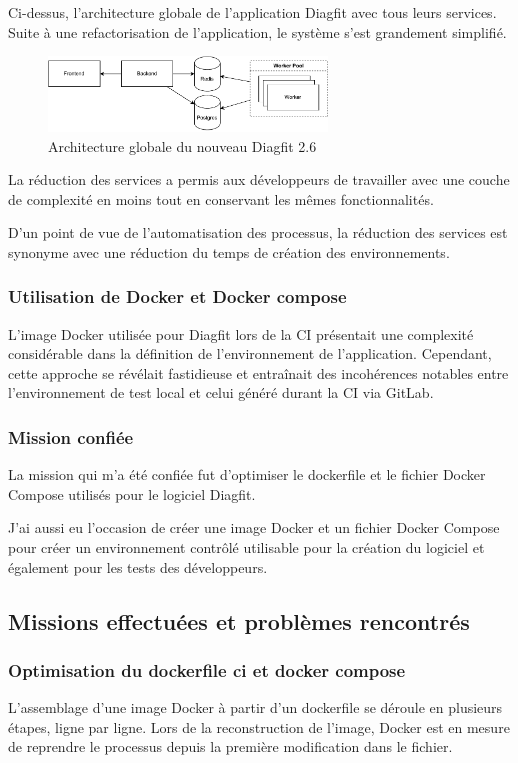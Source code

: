 Ci-dessus, l'architecture globale de l'application Diagfit avec tous leurs services.
Suite à une refactorisation de l'application, le système s'est grandement simplifié.

\begin{figure}[ht!]
    \centering
    \includegraphics[width=0.66\textwidth]{paper/figures/archi2-6.pdf}
    \caption{Architecture globale du nouveau Diagfit 2.6}
    \label{fig:archi2-6}
\end{figure}

La réduction des services a permis aux développeurs de travailler avec une couche de complexité en moins tout en conservant les mêmes fonctionnalités.

D'un point de vue de l'automatisation des processus, la réduction des services est synonyme avec une réduction du temps de création des environnements.

\subsubsection{Utilisation de Docker et Docker compose}
L'image Docker utilisée pour Diagfit lors de la CI présentait une complexité considérable dans la définition de l'environnement de l'application.
Cependant, cette approche se révélait fastidieuse et entraînait des incohérences notables entre l'environnement de test local et celui généré durant la CI via GitLab.

\subsubsection{Mission confiée}
La mission qui m'a été confiée fut d'optimiser le dockerfile et le fichier Docker Compose utilisés pour le logiciel Diagfit.

J'ai aussi eu l'occasion de créer une image Docker et un fichier Docker Compose pour créer un environnement contrôlé utilisable pour la création du logiciel et également pour les tests des développeurs.


\subsection{Missions effectuées et problèmes rencontrés}
\subsubsection{Optimisation du dockerfile ci et docker compose}
L'assemblage d'une image Docker à partir d'un dockerfile se déroule en plusieurs étapes, ligne par ligne.
Lors de la reconstruction de l'image, Docker est en mesure de reprendre le processus depuis la première modification dans le fichier.

